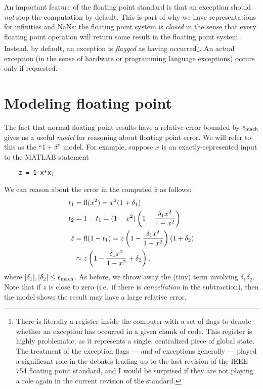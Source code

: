 \documentclass[12pt, leqno]{article} %
\begin{document}
An important feature of the floating point standard is that an
exception should {\em not} stop the computation by default.  This
is part of why we have representations for infinities and NaNs:
the floating point system is {\em closed} in the sense that every
floating point operation will return some result in the floating
point system.  Instead, by default, an exception is {\em flagged}
as having occurred\footnote{%
There is literally a register inside the computer with a set of
flags to denote whether an exception has occurred in a given
chunk of code.  This register is highly problematic, as it
represents a single, centralized piece of global state.  The
treatment of the exception flags --- and of exceptions generally ---
played a significant role in the debates leading up to the last revision
of the IEEE 754 floating point standard,
and I would be surprised if they are not playing a role again in the
current revision of the standard.
}.  An actual exception (in the sense of hardware
or programming language exceptions) occurs only if requested.

\section{Modeling floating point}

The fact that normal floating point results have a relative error
bounded by $\epsilon_{\mathrm{mach}}$ gives us a useful {\em model} for reasoning about
floating point error.  We will refer to this as the ``$1 + \delta$''
model.  For example, suppose $x$ is an exactly-represented input to
the MATLAB statement
\begin{lstlisting}
    z = 1-x*x;
\end{lstlisting}
We can reason about the error in the computed $\hat{z}$ as follows:
\begin{align*}
  t_1 &= \operatorname{fl}(x^2) = x^2 (1+\delta_1) \\
  t_2 &= 1-t_1 = (1-x^2)\left( 1 - \frac{\delta_1 x^2}{1-x^2} \right) \\
  \hat{z}
  &= \operatorname{fl}(1-t_1)
    = z \left( 1 - \frac{\delta_1 x^2}{1-x^2} \right)(1+\delta_2) \\
  & \approx z \left( 1 - \frac{\delta_1 x^2}{1-x^2} +\delta_2 \right),
\end{align*}
where $|\delta_1|, |\delta_2| \leq \epsilon_{\mathrm{mach}}$.  As before, we throw
away the (tiny) term involving $\delta_1 \delta_2$.
Note that if $z$ is close to zero (i.e.~if there is {\em cancellation} in the
subtraction), then the model shows the result may have a
large relative error.
\end{document}
